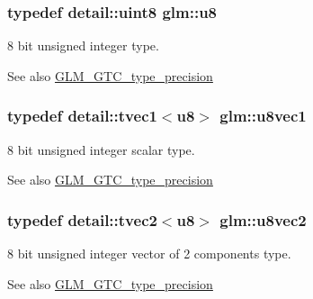 \subsubsection[{u8}]{\setlength{\rightskip}{0pt plus 5cm}typedef detail\+::uint8 {\bf glm\+::u8}}\label{group__gtc__type__precision_ga5e3dc67373d5068997d2d9f41c9024d2}
8 bit unsigned integer type. \begin{DoxySeeAlso}{See also}
\hyperlink{group__gtc__type__precision}{G\+L\+M\+\_\+\+G\+T\+C\+\_\+type\+\_\+precision} 
\end{DoxySeeAlso}
\hypertarget{group__gtc__type__precision_gac2309b4040a1432a8e1966b3a163b642}{}
\subsubsection[{u8vec1}]{\setlength{\rightskip}{0pt plus 5cm}typedef detail\+::tvec1$<$u8$>$ {\bf glm\+::u8vec1}}\label{group__gtc__type__precision_gac2309b4040a1432a8e1966b3a163b642}
8 bit unsigned integer scalar type. \begin{DoxySeeAlso}{See also}
\hyperlink{group__gtc__type__precision}{G\+L\+M\+\_\+\+G\+T\+C\+\_\+type\+\_\+precision} 
\end{DoxySeeAlso}
\hypertarget{group__gtc__type__precision_gaa8ef8673b38c3442eb22bff54c5f0e00}{}
\subsubsection[{u8vec2}]{\setlength{\rightskip}{0pt plus 5cm}typedef detail\+::tvec2$<$u8$>$ {\bf glm\+::u8vec2}}\label{group__gtc__type__precision_gaa8ef8673b38c3442eb22bff54c5f0e00}
8 bit unsigned integer vector of 2 components type. \begin{DoxySeeAlso}{See also}
\hyperlink{group__gtc__type__precision}{G\+L\+M\+\_\+\+G\+T\+C\+\_\+type\+\_\+precision} 
\end{DoxySeeAlso}
\hypertarget{group__gtc__type__precision_ga4dcca30d49842b1f4c919a0303944099}{}
